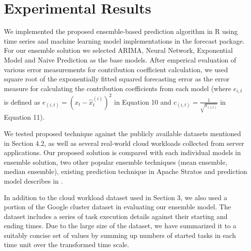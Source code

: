 
\section{Experimental Results}

We implemented the proposed ensemble-based prediction algorithm in R using time series and machine learning model implementations in the forecast package. For our ensemble solution we selected ARIMA, Neural Network, Exponential Model and Naive Prediction as the base models. After emperical  evaluation of various error measurements for contribution coefficient calculation, we used square root of the exponentially fitted squared  forecasting error as the error measure for calculating the contribution coefficients from each model (where $e_{i,t}$ is defined as $e_{(i,t)}=(x_t-\hat{x}^{(i)}_{t})^2$ in Equation 10 and $c_{(i,t)}=\frac{1}{\sqrt{b_{(i,t)}}}$ in Equation 11).

We tested proposed technique against the publicly available datasets mentioned in Section 4.2, as well as several real-world cloud workloads \cite{AutoscaleAnalyser} collected from server applications. Our proposed solution is compared with each individual models in ensemble solution, two other popular ensemble techniques (mean ensemble, median ensemble), existing prediction technique in Apache Stratos and prediction model describes in \cite{Roy_2011}. 

In addition to the cloud workload dataset used in Section 3, we also used a portion of the Google cluster dataset \cite{GoogleClusterData} in evaluating our ensemble model. The dataset includes a series of task execution details against their starting and ending times. Due to the large size of the dataset, we have summarized it to a suitably concise set of values by summing up numbers of started tasks in each time unit over the transformed time scale.

